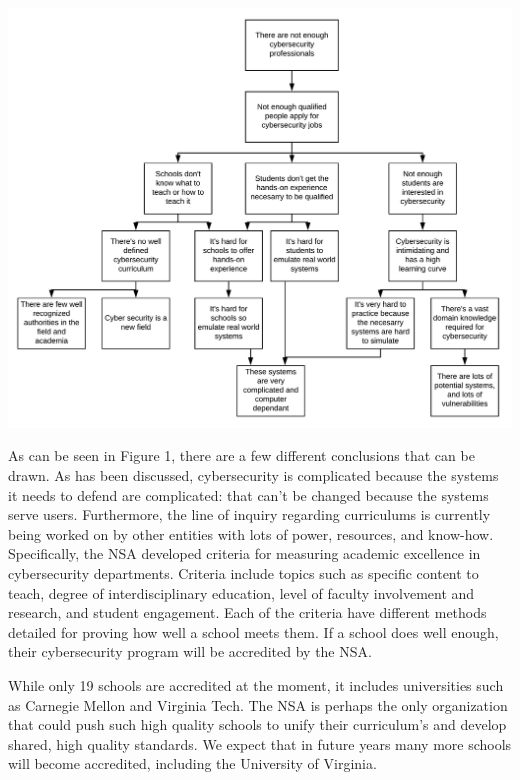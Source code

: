 \documentclass[openright]{report}
\begin{document}
\begin{center}
    \includegraphics[scale=0.34]{images/Why-Why.png}
\end{center}

\par As can be seen in Figure 1, there are a few different conclusions that can be drawn. As has been discussed, cybersecurity is complicated because the systems it needs to defend are complicated: that can't be changed because the systems serve users. Furthermore, the line of inquiry regarding curriculums is currently being worked on by other entities with lots of power, resources, and know-how. Specifically, the NSA developed criteria for measuring academic excellence in cybersecurity departments. Criteria include topics such as specific content to teach, degree of interdisciplinary education, level of faculty involvement and research, and student engagement. Each of the criteria have different methods detailed for proving how well a school meets them. If a school does well enough, their cybersecurity program will be accredited by the NSA\cite{nsa_accred}. 

\par While only 19 schools are accredited at the moment, it includes universities such as Carnegie Mellon and Virginia Tech\cite{nsa_accred_schools}. The NSA is perhaps the only organization that could push such high quality schools to unify their curriculum's and develop shared, high quality standards. We expect that in future years many more schools will become accredited, including the University of Virginia. 
\end{document}
